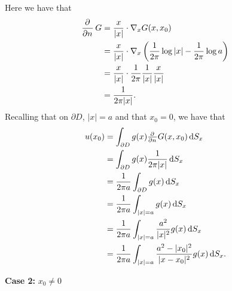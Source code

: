 \documentclass{article}
\begin{document}
Here we have that
%
\begin{align*}
    \dpd{}{n} G
        &= \frac{x}{|x|} \cdot \nabla_x G(x, x_0) \\
        &= \frac{x}{|x|} \cdot \nabla_x \del{\frac{1}{2 \pi} \log |x| - \frac{1}{2 \pi} \log a} \\
        &= \frac{x}{|x|} \cdot \frac{1}{2 \pi} \frac{1}{|x|} \frac{x}{|x|} \\
        &= \frac{1}{2 \pi |x|}
        .
\end{align*}
%
Recalling that on $\partial D$, $|x| = a$ and that $x_0 = 0$, we have that
%
\begin{align*}
    u(x_0)
        &= \int_{\partial D} g(x) \pd{}{n} G(x, x_0) \dif S_x \\
        &= \int_{\partial D} g(x) \frac{1}{2 \pi |x|} \dif S_x \\
        &= \frac{1}{2 \pi a} \int_{\partial D} g(x) \dif S_x \\
        &= \frac{1}{2 \pi a} \int_{|x| = a} g(x) \dif S_x \\
        &= \frac{1}{2 \pi a} \int_{|x| = a} \frac{a^2}{|x|^2} g(x) \dif S_x \\
        &= \frac{1}{2 \pi a} \int_{|x| = a} \frac{a^2 - |x_0|^2}{|x - x_0|^2} g(x) \dif S_x
        .
\end{align*}

\textbf{Case 2:} $x_0 \neq 0$
\end{document}
